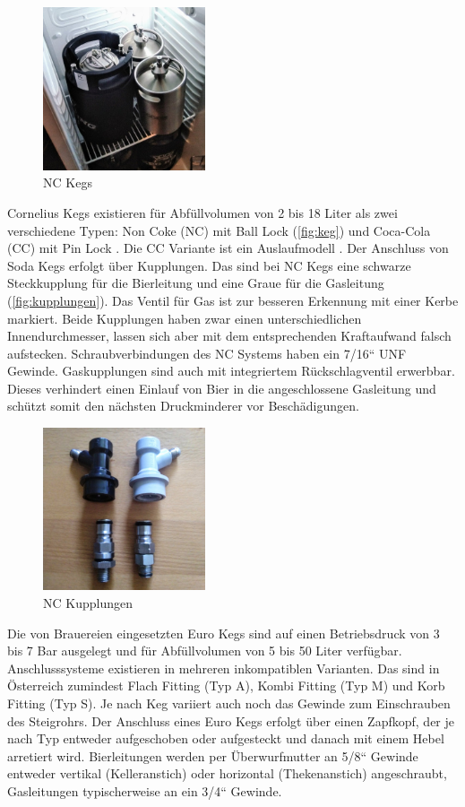 \documentclass[a4paper,parskip=half]{scrartcl}
\begin{document}
\begin{figure}[h]
\centering
\includegraphics[width=4.8cm]{images/keg.jpg}
\caption{NC Kegs}
\label{fig:keg}
\end{figure}

Cornelius Kegs existieren für Abfüllvolumen von 2 bis 18 Liter als zwei verschiedene Typen: Non Coke (NC) mit Ball Lock (\autoref{fig:keg}) und Coca-Cola (CC) mit Pin Lock \autocite{Westemeier1995}. Die CC Variante ist ein Auslaufmodell \autocite{Gretzschel2016}. Der Anschluss von Soda Kegs erfolgt über Kupplungen. Das sind bei NC Kegs eine schwarze Steckkupplung für die Bierleitung und eine Graue für die Gasleitung (\autoref{fig:kupplungen}). Das Ventil für Gas ist zur besseren Erkennung mit einer Kerbe markiert. Beide Kupplungen haben zwar einen unterschiedlichen Innendurchmesser, lassen sich aber mit dem entsprechenden Kraftaufwand falsch aufstecken. Schraubverbindungen des NC Systems haben ein 7/16“ UNF Gewinde. Gaskupplungen sind auch mit integriertem Rückschlagventil erwerbbar. Dieses verhindert einen Einlauf von Bier in die angeschlossene Gasleitung und schützt somit den nächsten Druckminderer vor Beschädigungen.

\begin{figure}[h]
\centering
\includegraphics[width=4.8cm]{images/kupplungen.jpg}
\caption{NC Kupplungen}
\label{fig:kupplungen}
\end{figure}

Die von Brauereien eingesetzten Euro Kegs sind auf einen Betriebsdruck von 3 bis 7 Bar ausgelegt und für Abfüllvolumen von 5 bis 50 Liter verfügbar. Anschlusssysteme existieren in mehreren inkompatiblen Varianten. Das sind in Österreich zumindest Flach Fitting (Typ A), Kombi Fitting (Typ M) und Korb Fitting (Typ S). Je nach Keg variiert auch noch das Gewinde zum Einschrauben des Steigrohrs. \autocite{HWBS2021a} Der Anschluss eines Euro Kegs erfolgt über einen Zapfkopf, der je nach Typ entweder aufgeschoben oder aufgesteckt und danach mit einem Hebel arretiert wird. Bierleitungen werden per Überwurfmutter an 5/8“ Gewinde entweder vertikal (Kelleranstich) oder horizontal (Thekenanstich) angeschraubt, Gasleitungen typischerweise an ein 3/4“ Gewinde.
\end{document}

